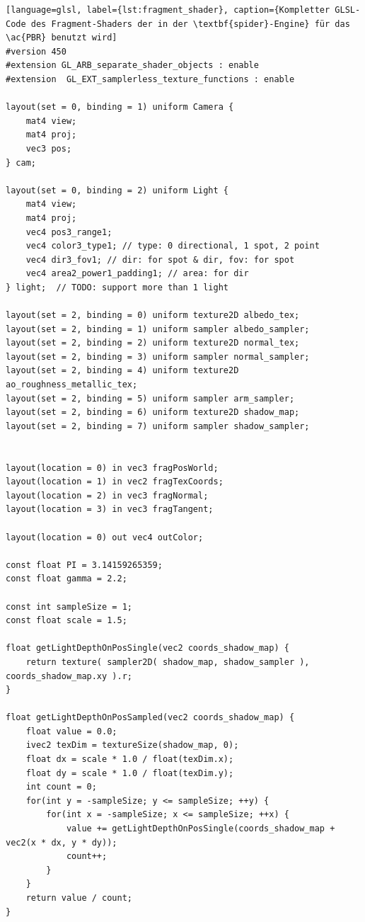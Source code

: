 \documentclass[oneside]{ausarbeitung}
\begin{document}
\begin{lstlisting}[language=glsl, label={lst:fragment_shader}, caption={Kompletter GLSL-Code des Fragment-Shaders der in der \textbf{spider}-Engine} für das \ac{PBR} benutzt wird]
#version 450
#extension GL_ARB_separate_shader_objects : enable
#extension  GL_EXT_samplerless_texture_functions : enable

layout(set = 0, binding = 1) uniform Camera {
    mat4 view;
    mat4 proj;
    vec3 pos;
} cam;

layout(set = 0, binding = 2) uniform Light {
    mat4 view;
    mat4 proj;
    vec4 pos3_range1;
    vec4 color3_type1; // type: 0 directional, 1 spot, 2 point
    vec4 dir3_fov1; // dir: for spot & dir, fov: for spot
    vec4 area2_power1_padding1; // area: for dir
} light;  // TODO: support more than 1 light

layout(set = 2, binding = 0) uniform texture2D albedo_tex;
layout(set = 2, binding = 1) uniform sampler albedo_sampler;
layout(set = 2, binding = 2) uniform texture2D normal_tex;
layout(set = 2, binding = 3) uniform sampler normal_sampler;
layout(set = 2, binding = 4) uniform texture2D ao_roughness_metallic_tex;
layout(set = 2, binding = 5) uniform sampler arm_sampler;
layout(set = 2, binding = 6) uniform texture2D shadow_map;
layout(set = 2, binding = 7) uniform sampler shadow_sampler;


layout(location = 0) in vec3 fragPosWorld;
layout(location = 1) in vec2 fragTexCoords;
layout(location = 2) in vec3 fragNormal;
layout(location = 3) in vec3 fragTangent;

layout(location = 0) out vec4 outColor;

const float PI = 3.14159265359;
const float gamma = 2.2;

const int sampleSize = 1;
const float scale = 1.5;

float getLightDepthOnPosSingle(vec2 coords_shadow_map) {
    return texture( sampler2D( shadow_map, shadow_sampler ), coords_shadow_map.xy ).r;
}

float getLightDepthOnPosSampled(vec2 coords_shadow_map) {
    float value = 0.0;
    ivec2 texDim = textureSize(shadow_map, 0);
    float dx = scale * 1.0 / float(texDim.x);
    float dy = scale * 1.0 / float(texDim.y);
    int count = 0;
    for(int y = -sampleSize; y <= sampleSize; ++y) {
        for(int x = -sampleSize; x <= sampleSize; ++x) {
            value += getLightDepthOnPosSingle(coords_shadow_map + vec2(x * dx, y * dy));
            count++;
        }
    }
    return value / count;
}


\end{lstlisting}
\end{document}
